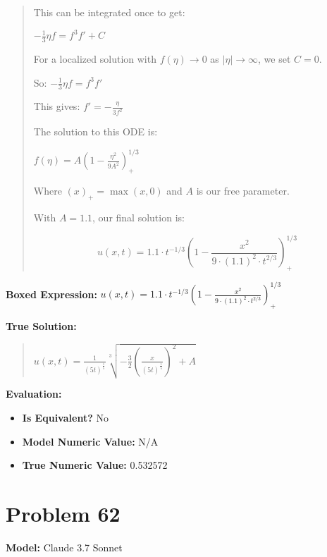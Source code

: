 \documentclass{article}
\begin{document}
\begin{quote}
This can be integrated once to get:

$-\frac{1}{3}\eta f = f^3f' + C$



For a localized solution with $f(\eta) \rightarrow 0$ as $|\eta| \rightarrow \infty$, we set $C = 0$.



So: $-\frac{1}{3}\eta f = f^3f'$



This gives: $f' = -\frac{\eta}{3f^2}$



The solution to this ODE is:

$f(\eta) = A(1-\frac{\eta^2}{9A^2})_+^{1/3}$



Where $(x)_+ = \max(x,0)$ and $A$ is our free parameter.



With $A = 1.1$, our final solution is:



$$\boxed{u(x,t) = 1.1 \cdot t^{-1/3} \left(1-\frac{x^2}{9 \cdot (1.1)^2 \cdot t^{2/3}}\right)_+^{1/3}}$$
\end{quote}
\textbf{Boxed Expression:} $u(x,t) = 1.1 \cdot t^{-1/3} \left(1-\frac{x^2}{9 \cdot (1.1)^2 \cdot t^{2/3}}\right)_+^{1/3}$

\textbf{True Solution:}
\begin{quote}
$u(x,t) = \frac{1}{(5t)^{\frac{1}{5}}} \sqrt[3]{-\frac{3}{2}\left(\frac{x}{(5t)^{\frac{1}{5}}}\right)^2 + A}$
\end{quote}

\textbf{Evaluation:}
\begin{itemize}
\item \textbf{Is Equivalent?} No
\item \textbf{Model Numeric Value:} N/A
\item \textbf{True Numeric Value:} 0.532572
\end{itemize}
\vspace{1cm}
\section*{Problem 62}
\textbf{Model:} Claude 3.7 Sonnet
\end{document}
